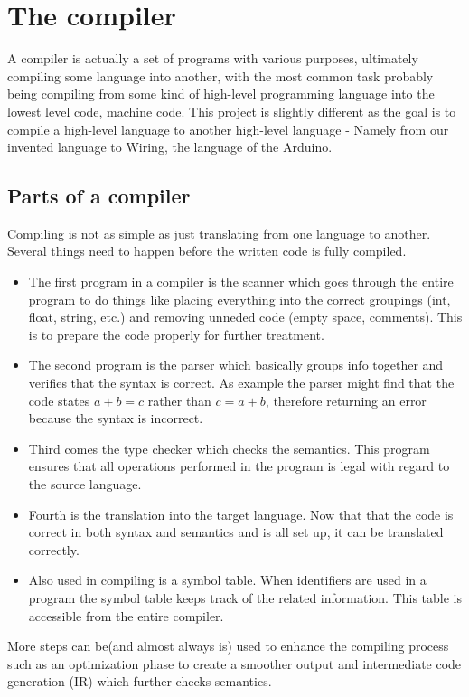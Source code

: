 \section{The compiler}
A compiler is actually a set of programs with various purposes, ultimately compiling some language into another, with the most common task probably being compiling from some kind of high-level programming language into the lowest level code, machine code. This project is slightly different as the goal is to compile a high-level language to another high-level language - Namely from our invented language to Wiring, the language of the Arduino.
\subsection{Parts of a compiler}
Compiling is not as simple as just translating from one language to another. Several things need to happen before the written code is fully compiled.\\

\begin{itemize}
	\item The first program in a compiler is the scanner which goes through the entire program to do things like placing everything into the correct groupings (int, float, string, etc.) and removing unneded code (empty space, comments). This is to prepare the code properly for further treatment.
	\item The second program is the parser which basically groups info together and verifies that the syntax is correct. As example the parser might find that the code states $a + b = c$ rather than $c = a + b$, therefore returning an error because the syntax is incorrect.\\

	\item Third comes the type checker which checks the semantics. This program ensures that all operations performed in the program is legal with regard to the source language.

	\item Fourth is the translation into the target language. Now that that the code is correct in both syntax and semantics and is all set up, it can be translated correctly.

	\item Also used in compiling is a symbol table. When identifiers are used in a program the symbol table keeps track of the related information. This table is accessible from the entire compiler.
\end{itemize}

More steps can be(and almost always is) used to enhance the compiling process such as an optimization phase to create a smoother output and intermediate code generation (IR) which further checks semantics.